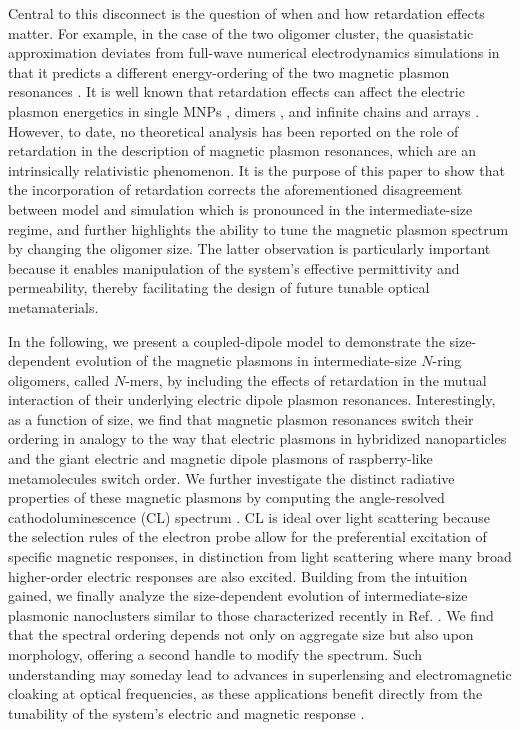 \documentclass[journal=apchd5,manuscript=article]{achemso}
\begin{document}
Central to this disconnect is the question of when and how retardation effects matter. For example, in the case of the two oligomer cluster, the quasistatic approximation deviates from full-wave numerical electrodynamics simulations in that it predicts a different energy-ordering of the two magnetic plasmon resonances \cite{Cherqui2014}. It is well known that retardation effects can affect the electric plasmon energetics in single MNPs \cite{Gu2010}, dimers \cite{Oubre2004,vonPlessen2007}, and infinite chains and arrays \cite{Lucas1976,ARAVIND1981,Kottman2001,Schatz2003,NordHal2003,NordProdan2004,Rechbacher2003,Schatz2003,Royer2005,Abajo2008,Gomez2009,Chumanov2010,Pinchuk2016}. However, to date, no theoretical analysis has been reported on the role of retardation in the description of magnetic plasmon resonances, which are an intrinsically relativistic phenomenon. It is the purpose of this paper to show that the incorporation of retardation corrects the aforementioned disagreement between model and simulation which is pronounced in the intermediate-size regime, and further highlights the ability to tune the magnetic plasmon spectrum by changing the oligomer size. The latter observation is particularly important because it enables manipulation of the system's effective permittivity and permeability, thereby facilitating the design of future tunable optical metamaterials.



In the following, we present a coupled-dipole model to demonstrate the size-dependent evolution of the magnetic plasmons in intermediate-size $N$-ring oligomers, called $N$-mers, by including the effects of retardation in the mutual interaction of their underlying electric dipole plasmon resonances. Interestingly, as a function of size, we find that magnetic plasmon resonances switch their ordering in analogy to the way that electric plasmons in hybridized nanoparticles \cite{vonPlessen2007} and the giant electric and magnetic dipole plasmons of raspberry-like metamolecules \cite{Fakhraai2018} switch order. We further investigate the distinct radiative properties of these magnetic plasmons by computing the angle-resolved cathodoluminescence (CL) spectrum \cite{Hohenester2012,Hohenester2014,Coenen2011,CoPol2011,Polman2014}. CL is ideal over light scattering because the selection rules of the electron probe allow for the preferential excitation of specific magnetic responses, in distinction from light scattering where many broad higher-order electric responses are also excited. Building from the intuition gained, we finally analyze the size-dependent evolution of intermediate-size plasmonic nanoclusters similar to those characterized recently in Ref. \cite{Engheta2017}. We find that the spectral ordering depends not only on aggregate size but also upon morphology, offering a second handle to modify the spectrum. Such understanding may someday lead to advances in superlensing and electromagnetic cloaking at optical frequencies, as these applications benefit directly from the tunability of the system's electric and magnetic response \cite{Pendry03,Fang2005,Cai2007,Pinchuk07,Shalaev2008,Valentine2008,Ferrari09,Tian2018}.
\end{document}
